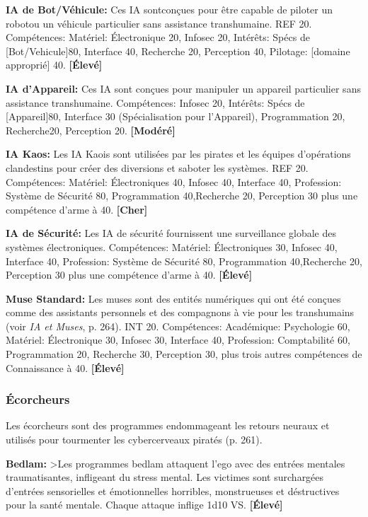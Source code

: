 \textbf{IA de Bot/Véhicule:} Ces IA sontconçues pour être capable de piloter un robotou un véhicule particulier sans assistance transhumaine. REF 20. Compétences: Matériel: Électronique 20, Infosec 20, Intérêts: Spécs de [Bot/Vehicule]80, Interface 40, Recherche 20, Perception 40, Pilotage: [domaine approprié] 40. \textbf{[Élevé]} 

\textbf{IA d'Appareil:} Ces IA sont conçues pour manipuler un appareil particulier sans assistance transhumaine. Compétences: Infosec 20, Intérêts: Spécs de [Appareil]80, Interface 30 (Spécialisation pour l'Appareil), Programmation 20, Recherche20, Perception 20. \textbf{[Modéré]} 

\textbf{IA Kaos:} Les IA Kaois sont utilisées par les pirates et les équipes d'opérations clandestins pour créer des diversions et saboter les systèmes. REF 20. Compétences: Matériel: Électroniques 40, Infosec 40, Interface 40, Profession: Système de Sécurité 80, Programmation 40,Recherche 20, Perception 30 plus une compétence d'arme à 40. \textbf{[Cher]} 

\textbf{IA de Sécurité:} Les IA de sécurité fournissent une surveillance globale des systèmes électroniques. Compétences: Matériel: Électroniques 30, Infosec 40, Interface 40, Profession: Système de Sécurité 80, Programmation 40,Recherche 20, Perception 30 plus une compétence d'arme à 40. \textbf{[Élevé]} 

\textbf{Muse Standard:} Les muses sont des entités numériques qui ont été conçues comme des assistants personnels et des compagnons à vie pour les transhumains (voir \emph{IA et Muses}, p. 264). INT 20. Compétences: Académique: Psychologie 60, Matériel: Électronique 30, Infosec 30, Interface 40, Profession: Comptabilité 60, Programmation 20, Recherche 30, Perception 30, plus trois autres compétences de Connaissance à 40. \textbf{[Élevé]} 

\subsubsection{Écorcheurs} 

Les écorcheurs sont des programmes endommageant les retours neuraux et utilisés pour tourmenter les cybercerveaux piratés (p. 261). 

\textbf{Bedlam:} >Les programmes bedlam attaquent l'ego avec des entrées mentales traumatisantes, infligeant du stress mental. Les victimes sont surchargées d'entrées sensorielles et émotionnelles horribles, monstrueuses et déstructives pour la santé mentale. Chaque attaque inflige 1d10 VS. \textbf{[Élevé]} 

